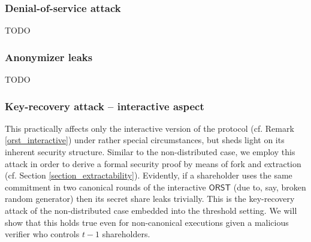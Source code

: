 \documentclass[psamsfonts, reqno]{amsart}
\theoremstyle{definition}
\theoremstyle{remark}
\numberwithin{equation}{section}
\begin{document}
\subsubsection{Denial-of-service attack}\label{section_denial_of_service_attack}
TODO

\subsubsection{Anonymizer leaks}\label{section_anonymizer_leaks}
TODO

\subsubsection{Key-recovery attack -- interactive aspect}\label{section_key_recovery_attack}
This practically affects only
the interactive version of the protocol
(cf. Remark \ref{orst_interactive})
under rather special circumstances,
but sheds light on its inherent security structure.
Similar to the non-distributed case,
we employ this attack in order to derive
a formal security proof by means of fork and extraction
(cf. Section \ref{section_extractability}).
Evidently, if a shareholder uses the same commitment
in two canonical rounds of the interactive $\mathsf{ORST}$
(due to, say, broken random generator)
then its secret share leaks trivially.
This is the key-recovery attack
of the non-distributed case embedded into the threshold setting.
We will show that this holds true
even for non-canonical executions
given a malicious verifier who controls $t-1$ shareholders.
\end{document}
